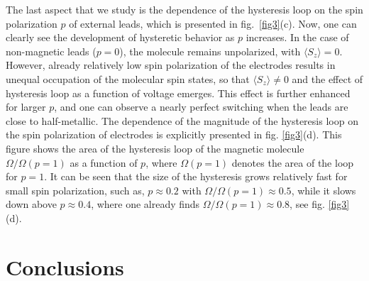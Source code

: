 \documentclass[doublecol]{epl2} %
\begin{document}
The last aspect that we study is the dependence of the hysteresis loop
on the spin polarization $p$ of external leads, which is presented in fig.~\ref{fig3}(c).
Now, one can clearly see the development of hysteretic behavior
as $p$ increases. In the case of non-magnetic leads (\mbox{$p=0$}),
the molecule remains unpolarized, with \mbox{$\langle S_z \rangle = 0$}.
However, already relatively low spin polarization of the electrodes
results in unequal occupation of the molecular spin states,
so that \mbox{$\langle S_z \rangle \neq 0$} and the effect of hysteresis loop
as a function of voltage emerges.
This effect is further enhanced for larger $p$,
and one can observe a nearly perfect switching 
when the leads are close to half-metallic.
The dependence of the magnitude of the hysteresis loop 
on the spin polarization of electrodes is explicitly presented
in fig. \ref{fig3}(d). This figure
shows the area of the hysteresis loop of the magnetic molecule \mbox{$\Omega / \Omega(p=1)$}
as a function of $p$, where \mbox{$\Omega(p=1)$} denotes
the area of the loop for \mbox{$p=1$}.
It can be seen  that the size of the hysteresis grows
relatively fast for small spin polarization,
such as, \mbox{$p\approx 0.2$} with  \mbox{$\Omega/\Omega(p=1) \approx 0.5 $},
while it slows down above \mbox{$p\approx 0.4$},
where one already finds \mbox{$\Omega/\Omega(p=1) \approx 0.8 $},
see fig. \ref{fig3}(d).


\section{Conclusions}
\end{document}
